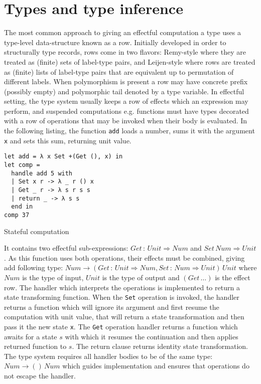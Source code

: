 \documentclass[inz, english, shortabstract]{iithesis}
\begin{document}
\section{Types and type inference}
The most common approach to giving an effectful computation a type uses a type-level data-structure known as a row.
Initially developed in order to structurally type records, rows come in two flavors: Remy-style\cite{Remy1994} where they are treated as (finite) sets of label-type pairs, and Leijen-style\cite{Leijen2005} where rows are treated as (finite) lists of label-type pairs that are equivalent up to permutation of different labels.
When polymorphism is present a row may have concrete prefix (possibly empty) and polymorphic tail denoted by a type variable.
In effectful setting, the type system usually keeps a row of effects which an expression may perform, and suspended computations e.g. functions must have types decorated with a row of operations that may be invoked when their body is evaluated.
In the following listing, the function \texttt{add} loads a number, sums it with the argument \texttt{x} and sets this sum, returning unit value.
\begin{listing}[H]
  \begin{verbatim}
let add = λ x Set +(Get (), x) in
let comp = 
  handle add 5 with
  | Set x r -> λ _ r () x
  | Get _ r -> λ s r s s
  | return _ -> λ s s
  end in
comp 37
  \end{verbatim}
  \caption{Stateful computation}
  \label{lst:stateful-computation}
\end{listing}
It contains two effectful sub-expressions: $Get \, : \, Unit \Rightarrow Num$ and $Set \, Num \Rightarrow Unit$.
As this function uses both operations, their effects must be combined, giving add following type: $Num \rightarrow (Get \, : \, Unit \Rightarrow Num , Set \, : \, Num \Rightarrow Unit) \, Unit$ where $Num$ is the type of input, $Unit$ is the type of output and $(Get \, \ldots)$ is the effect row.
The handler which interprets the operations is implemented to return a state transforming function.
When the \texttt{Set} operation is invoked, the handler returns a function which will ignore its argument and first resume the computation with unit value, that will return a state transformation and then pass it the new state \texttt{x}.
The \texttt{Get} operation handler returns a function which awaits for a state $s$ with which it resumes the continuation and then applies returned function to $s$.
The return clause returns identity state transformation.
The type system requires all handler bodies to be of the same type: $Num \rightarrow () \, Num$ which guides implementation and ensures that operations do not escape the handler.
\end{document}
